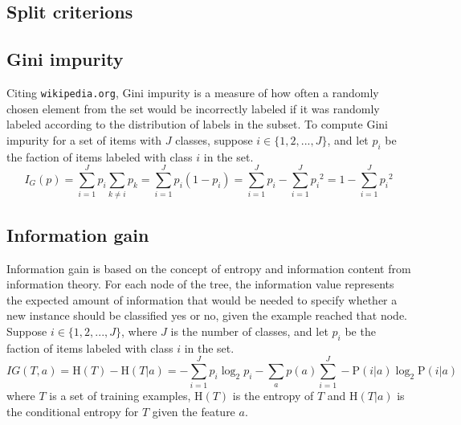 \documentclass[11pt, a4paper]{article}
\begin{document}
\newpage
\begin{appendix}
  \section{Split criterions}
    \label{appendix:splitcriterions}
    \subsection{Gini impurity}
      Citing \texttt{wikipedia.org}, Gini impurity is a measure of how often a randomly chosen element from the set would be incorrectly labeled if it was randomly labeled according to the distribution of labels in the subset. To compute Gini impurity for a set of items with $J$ classes, suppose $i\in\{1,2,...,J\}$, and let $p_{i}$ be the faction of items labeled with class $i$ in the set.
      \[{I} _{G}(p)=\sum _{i=1}^{J}p_{i}\sum _{k\neq i}p_{k}=\sum _{i=1}^{J}p_{i}(1-p_{i})=\sum _{i=1}^{J}p_{i}-\sum _{i=1}^{J}{p_{i}}^{2}=1-\sum _{i=1}^{J}{p_{i}}^{2}\]
    \subsection{Information gain}
      Information gain is based on the concept of entropy and information content from information theory. For each node of the tree, the information value represents the expected amount of information that would be needed to specify whether a new instance should be classified yes or no, given the example reached that node. Suppose $i\in\{1,2,...,J\}$, where $J$ is the number of classes, and let $p_{i}$ be the faction of items labeled with class $i$ in the set.
      \[IG(T, a)=\mathrm{H}(T)-\mathrm{H}(T|a)=-\sum _{i=1}^{J}p_{i}\log _{2}{p_{i}}-\sum _{a}{p(a)\sum _{i=1}^{J}-\mathrm{P}(i|a)\log _{2}{\mathrm{P}(i|a)}}\]
      where $T$ is a set of training examples, $\mathrm{H}(T)$ is the entropy of $T$ and $\mathrm{H}(T|a)$ is the conditional entropy for $T$ given the feature $a$.


\end{appendix}
\end{document}
